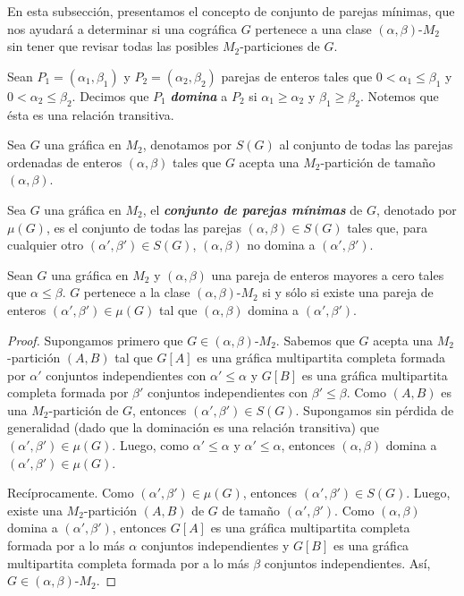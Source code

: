 En esta subsección, presentamos el concepto de conjunto de parejas mínimas, que nos ayudará a determinar si una cográfica $G$ pertenece a una clase $(\alpha, \beta)$-$M_2$ sin tener que revisar todas las posibles $M_2$-particiones de $G$.

Sean $P_1=(\alpha_1, \beta_1)$ y $P_2=(\alpha_2, \beta_2)$ parejas de enteros tales que $0 < \alpha_1 \le \beta_1$ y $0 < \alpha_2 \le \beta_2$. Decimos que $P_1$ \emph{\textbf{domina}} a $P_2$ si $\alpha_1 \geq \alpha_2$ y $\beta_1 \geq \beta_2$. Notemos que ésta es una relación transitiva.

Sea $G$ una gráfica en $M_2$, denotamos por $S(G)$ al conjunto de todas las parejas ordenadas de enteros $(\alpha, \beta)$ tales que $G$ acepta una $M_2$-partición de tamaño $(\alpha, \beta)$.

Sea $G$ una gráfica en $M_2$, el \textbf{\emph{conjunto de parejas mínimas}} de $G$, denotado por $\mu(G)$, es el conjunto de todas las parejas $(\alpha, \beta)\in S(G)$ tales que, para cualquier otro $(\alpha', \beta')\in S(G)$, $(\alpha, \beta)$ no domina a $(\alpha', \beta')$.

\begin{lemma}\label{lema_parejas_principal}
Sean $G$ una gráfica en $M_2$ y $(\alpha, \beta)$ una pareja de enteros mayores a cero tales que $\alpha \le \beta$. $G$ pertenece a la clase $(\alpha, \beta)$-$M_2$ si y sólo si existe una pareja de enteros $(\alpha', \beta')\in \mu(G)$ tal que $(\alpha, \beta)$ domina a $(\alpha', \beta')$.
\end{lemma}

\begin{proof}
Supongamos primero que $G\in (\alpha, \beta)\text{-}M_2$. Sabemos que $G$ acepta una $M_2$-partición $(A,B)$ tal que $G[A]$ es una gráfica multipartita completa formada por $\alpha'$ conjuntos independientes con $\alpha' \le \alpha$ y $G[B]$ es una gráfica multipartita completa formada por $\beta'$ conjuntos independientes con $\beta' \le \beta$. Como $(A,B)$ es una $M_2$-partición de $G$, entonces $(\alpha', \beta')\in S(G)$. Supongamos sin pérdida de generalidad (dado que la dominación es una relación transitiva) que $(\alpha', \beta')\in \mu(G)$. Luego, como $\alpha' \le \alpha$ y $\alpha' \le \alpha$, entonces $(\alpha, \beta)$ domina a $(\alpha', \beta') \in \mu(G)$.

Recíprocamente. Como $(\alpha', \beta')\in \mu(G)$, entonces $(\alpha', \beta')\in S(G)$. Luego, existe una $M_2$-partición $(A,B)$ de $G$ de tamaño $(\alpha', \beta')$. Como $(\alpha, \beta)$ domina a $(\alpha', \beta')$, entonces $G[A]$ es una gráfica multipartita completa formada por a lo más $\alpha$ conjuntos independientes y $G[B]$ es una gráfica multipartita completa formada por a lo más $\beta$ conjuntos independientes. Así, $G\in (\alpha, \beta)\text{-}M_2$.
\end{proof}


